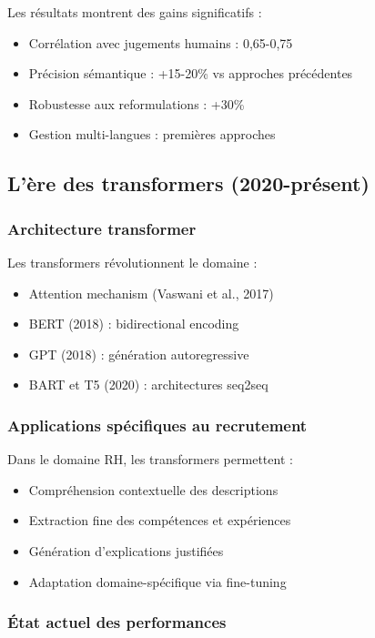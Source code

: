 \documentclass[12pt,a4paper]{report}
\begin{document}
Les résultats montrent des gains significatifs :
\begin{itemize}
\item Corrélation avec jugements humains : 0,65-0,75
\item Précision sémantique : +15-20\% vs approches précédentes
\item Robustesse aux reformulations : +30\%
\item Gestion multi-langues : premières approches
\end{itemize}

\subsection{L'ère des transformers (2020-présent)}

\subsubsection{Architecture transformer}

Les transformers révolutionnent le domaine :
\begin{itemize}
\item Attention mechanism (Vaswani et al., 2017)
\item BERT (2018) : bidirectional encoding
\item GPT (2018) : génération autoregressive
\item BART et T5 (2020) : architectures seq2seq
\end{itemize}

\subsubsection{Applications spécifiques au recrutement}

Dans le domaine RH, les transformers permettent :
\begin{itemize}
\item Compréhension contextuelle des descriptions
\item Extraction fine des compétences et expériences
\item Génération d'explications justifiées
\item Adaptation domaine-spécifique via fine-tuning
\end{itemize}

\subsubsection{État actuel des performances}
\end{document}
